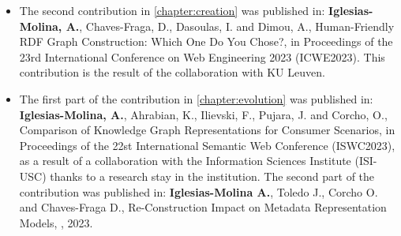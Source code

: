 \begin{itemize}
    \item The second contribution in \cref{chapter:creation} was published in: \textbf{Iglesias-Molina, A.}, Chaves-Fraga, D., Dasoulas, I. and Dimou, A., Human-Friendly RDF Graph Construction: Which One Do You Chose?, in Proceedings of the 23rd International Conference on Web Engineering 2023 (ICWE2023). This contribution is the result of the collaboration with KU Leuven.

    \item The first part of the contribution in \cref{chapter:evolution} was published 
    in: \textbf{Iglesias-Molina, A.}, Ahrabian, K., Ilievski, F., Pujara, J. and Corcho, O., Comparison of Knowledge Graph Representations for Consumer Scenarios, in Proceedings of the 22st International Semantic Web Conference (ISWC2023), as a result of a collaboration with the Information Sciences Institute (ISI-USC) thanks to a research stay in the institution.
    The second part of the contribution was published in: \textbf{Iglesias-Molina A.}, Toledo J., Corcho O. and Chaves-Fraga D., Re-Construction Impact on Metadata Representation Models, , 2023.

\end{itemize}


